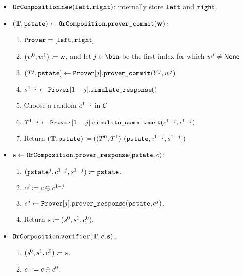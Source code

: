 \documentclass[11pt]{article}
\begin{document}
\begin{itemize}
  \item
  $\texttt{OrComposition}.\texttt{new}(\texttt{left}, \texttt{right})$: internally store $\texttt{left}$ and $\texttt{right}$.
  \item
  $(\mathbf {T}, \texttt{pstate})\gets \texttt{OrComposition}.\texttt{prover\_commit}(\mathbf {w})$:
    \begin{enumerate}
      \item $\texttt{Prover} = [\texttt{left}, \texttt{right}]$
      \item
        $(w^0,w^1)\coloneqq \mathbf {w}$, and let $j \in \bin$ be the first index for which $w^{j}\neq\mathsf{None}$
      \item
        $(T^j,\texttt{pstate})\gets\texttt{Prover}[j].\texttt{prover\_commit}(Y^j,w^j)$
      \item
			   $s^{1-j}\gets\texttt{Prover}[1-j].\texttt{simulate\_response}()$
			\item
        Choose a random $c^{1-j}$ in $\mathcal{C}$
      \item
        $T^{1-j}\gets\texttt{Prover}[1-j].\texttt{simulate\_commitment}(c^{1-j},s^{1-j})$
      \item
	Return $(\mathbf {T},\texttt{pstate}) \coloneqq ((T^0,T^1),(\texttt{pstate},c^{1-j},s^{1-j}))$
    \end{enumerate}
  \item
  $\mathbf {s} \gets \texttt{OrComposition}.\texttt{prover\_response}(\texttt{pstate}, c)$:
    \begin{enumerate}
      \item  $(\texttt{pstate}^j,c^{1-j},s^{1-j})\coloneqq\texttt{pstate}$.
      \item
         $c^j\coloneqq c\oplus c^{1-j}$
         \item $s^j\gets\texttt{Prover}[j].\texttt{prover\_response}(\texttt{pstate}, c^j)$.
      \item
        Return $\mathbf {s}\coloneqq(s^0,s^1, c^0)$.
    \end{enumerate}
  \item
  $\texttt{OrComposition}.\texttt{verifier}(\mathbf {T}, c, \mathbf {s})$,
    \begin{enumerate}
      \item
         $(s^0, s^1, c^0)\coloneqq \mathbf {s}$.
      \item
         $c^1\coloneqq c \oplus c^0$.

\end{enumerate}
\end{itemize}
\end{document}
